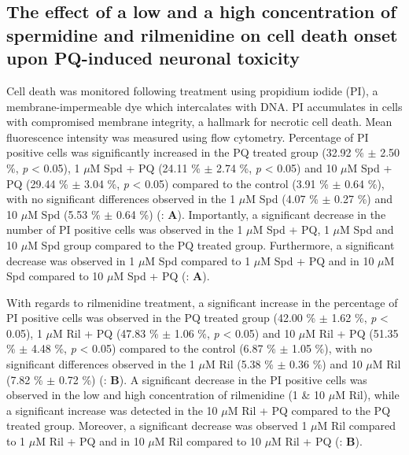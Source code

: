 \subsection{The effect of a low and a high concentration of spermidine and rilmenidine on cell death onset upon PQ-induced neuronal toxicity} 
Cell death was monitored following treatment using propidium iodide (PI), a membrane-impermeable dye which intercalates with DNA. PI accumulates in cells with compromised membrane integrity, a hallmark for necrotic cell death. Mean fluorescence intensity was measured using flow cytometry. Percentage of PI positive cells was significantly increased in the PQ treated group (32.92 \% $\pm$ 2.50 \%, \textit{p} < 0.05), 1 $\mu$M Spd + PQ (24.11 \% $\pm$ 2.74 \%, \textit{p} < 0.05) and 10 $\mu$M Spd + PQ (29.44 \% $\pm$ 3.04 \%, \textit{p} < 0.05) compared to the control (3.91 \% $\pm$ 0.64 \%), with no significant differences observed in the 1 $\mu$M Spd (4.07 \% $\pm$ 0.27 \%) and 10 $\mu$M Spd (5.53 \% $\pm$ 0.64 \%) (: \textbf{A}). Importantly, a significant decrease in the number of PI positive cells was observed in the 1 $\mu$M Spd + PQ, 1 $\mu$M Spd and 10 $\mu$M Spd group compared to the PQ treated group. Furthermore, a significant decrease was observed in 1 $\mu$M Spd compared to 1 $\mu$M Spd + PQ and in 10 $\mu$M Spd compared to 10 $\mu$M Spd + PQ (: \textbf{A}).

With regards to rilmenidine treatment, a significant increase in the percentage of PI positive cells was observed in the PQ treated group (42.00 \% $\pm$ 1.62 \%, \textit{p} < 0.05), 1 $\mu$M Ril + PQ (47.83 \% $\pm$ 1.06 \%, \textit{p} < 0.05) and 10 $\mu$M Ril + PQ (51.35 \% $\pm$ 4.48 \%, \textit{p} < 0.05) compared to the control (6.87 \% $\pm$ 1.05 \%), with no significant differences observed in the 1 $\mu$M Ril (5.38 \% $\pm$ 0.36 \%) and 10 $\mu$M Ril (7.82 \% $\pm$ 0.72 \%) (: \textbf{B}). A significant decrease in the PI positive cells was observed in the low and high concentration of rilmenidine (1 \& 10 $\mu$M Ril), while a significant increase was detected in the 10 $\mu$M Ril + PQ compared to the PQ treated group.  Moreover, a significant decrease was observed 1 $\mu$M Ril compared to 1 $\mu$M Ril + PQ and in 10 $\mu$M Ril compared to 10 $\mu$M Ril + PQ (: \textbf{B}).

